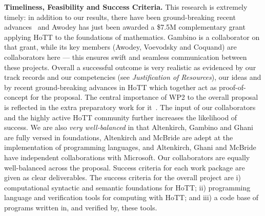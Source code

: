 \documentclass[a4paper,11pt]{article}
\begin{document}
{\bf Timeliness, Feasibility and Success Criteria.}  This research is
extremely timely: in addition to our results, there have been
ground-breaking recent advances~\cite{ShulmanM:uniidh,BezemM:cubsmt,
  nominal} and Awodey has just been awarded a \$7.5M complementary
grant applying HoTT to the foundations of mathematics. Gambino is a
collaborator on that grant, while its key members (Awodey, Voevodsky
and Coquand) are collaborators here --- this ensures swift and
seamless communication between these projects.  Overall a successful
outcome is very realistic as evidenced by our track records and our
competencies (see {\em Justification of Resources}), our ideas and by
recent ground-breaking advances in HoTT which together act as
proof-of-concept for the proposal. The central importance of WP2 to
the overall proposal is reflected in the extra preparatory work for
it~\cite{alti-ctt,txa-ihp14}.  The input of our collaborators and the
highly active HoTT community further increases the likelihood of
success. We are also {\em very well-balanced} in that Altenkirch,
Gambino and Ghani are fully versed in foundations, Altenkirch and
McBride are adept at the implementation of programming languages, and
Altenkirch, Ghani and McBride have independent collaborations with
Microsoft. Our collaborators are equally well-balanced across the
proposal. Success criteria for each work package are given as clear
deliverables. The success criteria for the overall project are i)
computational syntactic and semantic foundations for HoTT; ii)
programming language and verification tools for computing with HoTT;
and iii) a code base of programs written in, and verified by, these
tools.
\end{document}
